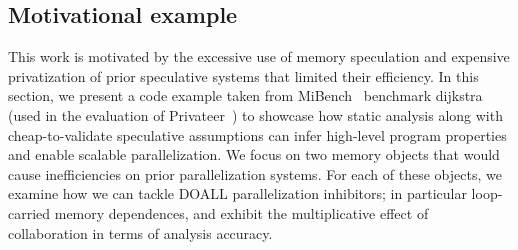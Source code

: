 

\subsection{Motivational example}

This work is motivated by the excessive use of memory speculation and expensive
privatization of prior speculative systems that limited their efficiency.
%
In this section, we present a code example taken from MiBench~\cite{} benchmark
dijkstra (used in the evaluation of Privateer~\cite{}) to showcase how static
analysis along with cheap-to-validate speculative assumptions can infer
high-level program properties and enable scalable parallelization.
%
We focus on two memory objects that would cause inefficiencies on prior
parallelization systems.
%
For each of these objects, we examine how we can tackle DOALL parallelization
inhibitors; in particular loop-carried memory dependences, and exhibit the
multiplicative effect of collaboration in terms of analysis accuracy.

